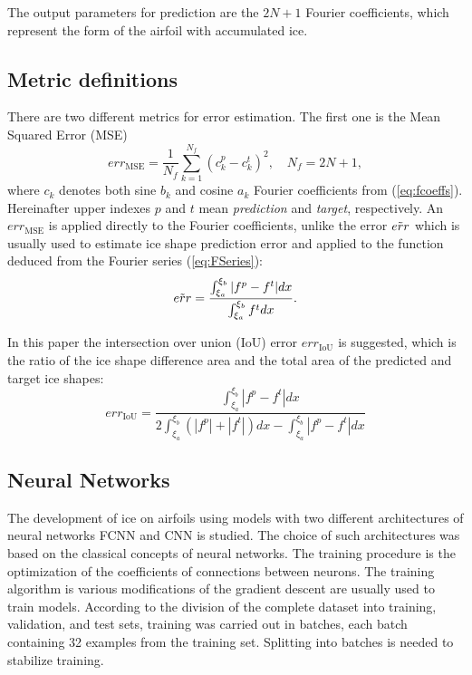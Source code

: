 \documentclass[aerospace,article,submit,moreauthors,pdftex]{Definitions/mdpi}
\begin{document}
The output parameters for prediction are the $2N +1$ Fourier coefficients, which represent the form of the airfoil with accumulated ice. 

\subsection{Metric definitions \label{sec:metric}}

There are two different metrics for error estimation. The first one is the Mean Squared Error (MSE)
\begin{equation}
    err_{\text{MSE}} = \frac{1}{N_f} \sum_{k = 1}^{N_f} \left( c^p_{k} - c^t_{k} \right)^2, \quad N_f = 2N + 1,
    \label{eq:MSE}
\end{equation}
where $c_k$ denotes both sine $b_k$ and cosine $a_k$ Fourier coefficients from (\ref{eq:fcoeffs}). Hereinafter upper indexes $p$ and $t$ mean \textit{prediction} and \textit{target}, respectively. An $err_{\text{MSE}}$ is applied directly to the Fourier coefficients, unlike the error $\Tilde{err}$ which is usually used to estimate ice shape prediction error \cite{OgretimHuebschShinn2006,ChangLengWuThompson2016} and applied to the function deduced from the Fourier series (\ref{eq:FSeries}):
\begin{equation}
    \Tilde{err} = \frac{\int_{\xi_a}^{\xi_b} | f^p - f^t | dx}{\int_{\xi_a}^{\xi_b} f^t dx}.
    \label{eq:oldIoU}
\end{equation}

In this paper the intersection over union (IoU) error $ err_{\text{IoU}}$ is suggested, which is the ratio of the ice shape difference area and the total area of the predicted and target ice shapes:
\begin{equation}
    err_{\text{IoU}} = \frac{\int_{\xi_a}^{\xi_b} | f^p - f^t | dx}{2 \int_{\xi_a}^{\xi_b} (|f^p| + |f^t|) dx - \int_{\xi_a}^{\xi_b}|f^p  -  f^t| dx}
    \label{eq:IoU}
\end{equation}

\subsection{Neural Networks \label{sec:NN}}

The development of ice on airfoils using models with two different architectures of neural networks FCNN and CNN is studied. The choice of such architectures was based on the classical concepts of neural networks. The training procedure is the optimization of the coefficients of connections between neurons. The training algorithm is various modifications of the gradient descent are usually used to train models. According to the division of the complete dataset into training, validation, and test sets, training was carried out in batches, each batch containing 32 examples from the training set. Splitting into batches is needed to stabilize training.
\end{document}
